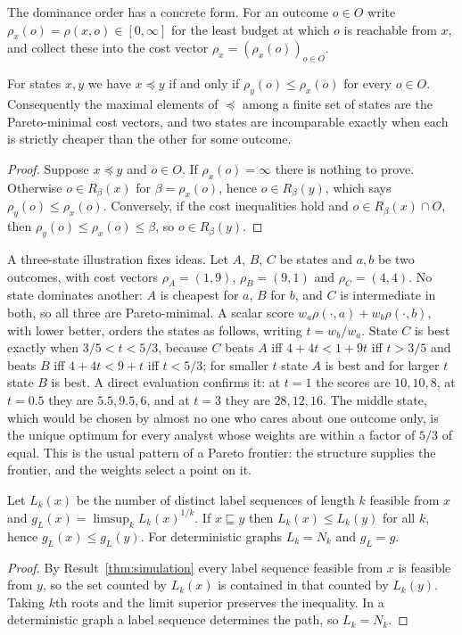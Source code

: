 The dominance order has a concrete form. For an outcome $o\in O$ write $\rho_x(o)=\rho(x,o)\in[0,\infty]$ for the least budget at which $o$ is reachable from $x$, and collect these into the cost vector $\rho_x=(\rho_x(o))_{o\in O}$.

\begin{newresult}\label{prop:cost-vector}
For states $x,y$ we have $x\preceq y$ if and only if $\rho_y(o)\le\rho_x(o)$ for every $o\in O$. Consequently the maximal elements of $\preceq$ among a finite set of states are the Pareto-minimal cost vectors, and two states are incomparable exactly when each is strictly cheaper than the other for some outcome.
\end{newresult}
\begin{proof}
Suppose $x\preceq y$ and $o\in O$. If $\rho_x(o)=\infty$ there is nothing to prove. Otherwise $o\in R_\beta(x)$ for $\beta=\rho_x(o)$, hence $o\in R_\beta(y)$, which says $\rho_y(o)\le\rho_x(o)$. Conversely, if the cost inequalities hold and $o\in R_\beta(x)\cap O$, then $\rho_y(o)\le\rho_x(o)\le\beta$, so $o\in R_\beta(y)$.
\end{proof}

A three-state illustration fixes ideas. Let $A$, $B$, $C$ be states and $a,b$ be two outcomes, with cost vectors $\rho_A=(1,9)$, $\rho_B=(9,1)$ and $\rho_C=(4,4)$. No state dominates another: $A$ is cheapest for $a$, $B$ for $b$, and $C$ is intermediate in both, so all three are Pareto-minimal. A scalar score $w_a\rho(\cdot,a)+w_b\rho(\cdot,b)$, with lower better, orders the states as follows, writing $t=w_b/w_a$. State $C$ is best exactly when $3/5<t<5/3$, because $C$ beats $A$ iff $4+4t<1+9t$ iff $t>3/5$ and beats $B$ iff $4+4t<9+t$ iff $t<5/3$; for smaller $t$ state $A$ is best and for larger $t$ state $B$ is best. A direct evaluation confirms it: at $t=1$ the scores are $10,10,8$, at $t=0.5$ they are $5.5,9.5,6$, and at $t=3$ they are $28,12,16$. The middle state, which would be chosen by almost no one who cares about one outcome only, is the unique optimum for every analyst whose weights are within a factor of $5/3$ of equal. This is the usual pattern of a Pareto frontier: the structure supplies the frontier, and the weights select a point on it.

\begin{newresult}\label{prop:sim-growth}
Let $L_k(x)$ be the number of distinct label sequences of length $k$ feasible from $x$ and $g_L(x)=\limsup_kL_k(x)^{1/k}$. If $x\sqsubseteq y$ then $L_k(x)\le L_k(y)$ for all $k$, hence $g_L(x)\le g_L(y)$. For deterministic graphs $L_k=N_k$ and $g_L=g$.
\end{newresult}
\begin{proof}
By Result~\ref{thm:simulation} every label sequence feasible from $x$ is feasible from $y$, so the set counted by $L_k(x)$ is contained in that counted by $L_k(y)$. Taking $k$th roots and the limit superior preserves the inequality. In a deterministic graph a label sequence determines the path, so $L_k=N_k$.
\end{proof}

